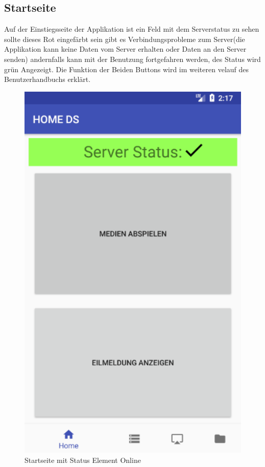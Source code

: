 \subsection{Startseite}
Auf der Einstiegsseite der Applikation ist ein Feld mit dem Serverstatus zu sehen sollte dieses Rot eingefärbt sein gibt es Verbindungsprobleme zum Server(die Applikation kann keine Daten vom Server erhalten oder Daten an den Server senden) andernfalls kann mit der Benutzung fortgefahren werden, des Status wird grün Angezeigt. Die Funktion der Beiden Buttons wird im weiteren velauf des Benutzerhandbuchs erklärt.
\\
\begin{figure}[H]
\centering
\includegraphics[width=1.0\textwidth]{images/06_AndroidApp/06_StatusOnline}
\caption{Startseite mit Status Element Online}
\label{fig:mediaNav}
\end{figure}

